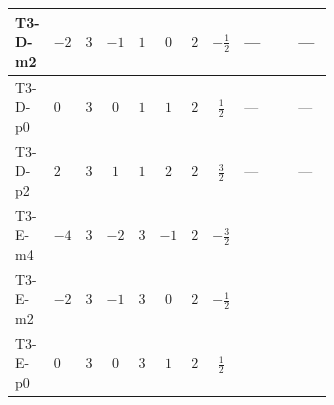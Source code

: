 \documentclass[8pt]{article}
\begin{document}
\begin{landscape}
\begin{longtable}{@{}llcccccc >{\raggedright\arraybackslash}p{0.21\linewidth} >{\raggedright\arraybackslash}p{0.21\linewidth} >{\raggedright\arraybackslash}p{0.21\linewidth}@{}}
\midrule
T3-D-m2 & $-2$ & $3$ & $-1$ & $1$ & $0$ & $2$ & $-\frac{1}{2}$ & --- & \scriptsize\adjustbox{max width=\linewidth}{$\begin{gathered} +10 {\lambda_{S_2}^{(1)}}^2\end{gathered}$} & --- \\
\midrule
T3-D-p0 & $0$ & $3$ & $0$ & $1$ & $1$ & $2$ & $\frac{1}{2}$ & --- & \scriptsize\adjustbox{max width=\linewidth}{$\begin{gathered} +10 {\lambda_{S_2}^{(1)}}^2\end{gathered}$} & --- \\
\midrule
T3-D-p2 & $2$ & $3$ & $1$ & $1$ & $2$ & $2$ & $\frac{3}{2}$ & --- & \scriptsize\adjustbox{max width=\linewidth}{$\begin{gathered} +10 {\lambda_{S_2}^{(1)}}^2\end{gathered}$} & --- \\
\midrule
T3-E-m4 & $-4$ & $3$ & $-2$ & $3$ & $-1$ & $2$ & $-\frac{3}{2}$ & \scriptsize\adjustbox{max width=\linewidth}{$\begin{gathered} +\frac{3 {\lambda_{HS_2}^{(A)}}^2}{2}\end{gathered}$} & \scriptsize\adjustbox{max width=\linewidth}{$\begin{gathered} +14 {\lambda_{S_2}^{(1)}}^2\end{gathered}$} & \scriptsize\adjustbox{max width=\linewidth}{$\begin{gathered} +26 {\lambda_{S_2}^{(A)}}^2\end{gathered}$} \\
\midrule
T3-E-m2 & $-2$ & $3$ & $-1$ & $3$ & $0$ & $2$ & $-\frac{1}{2}$ & \scriptsize\adjustbox{max width=\linewidth}{$\begin{gathered} +\frac{3 {\lambda_{HS_2}^{(A)}}^2}{2}\end{gathered}$} & \scriptsize\adjustbox{max width=\linewidth}{$\begin{gathered} +14 {\lambda_{S_2}^{(1)}}^2\end{gathered}$} & \scriptsize\adjustbox{max width=\linewidth}{$\begin{gathered} +26 {\lambda_{S_2}^{(A)}}^2\end{gathered}$} \\
\midrule
T3-E-p0 & $0$ & $3$ & $0$ & $3$ & $1$ & $2$ & $\frac{1}{2}$ & \scriptsize\adjustbox{max width=\linewidth}{$\begin{gathered} +\frac{3 {\lambda_{HS_2}^{(A)}}^2}{2}\end{gathered}$} & \scriptsize\adjustbox{max width=\linewidth}{$\begin{gathered} +14 {\lambda_{S_2}^{(1)}}^2\end{gathered}$} & \scriptsize\adjustbox{max width=\linewidth}{$\begin{gathered} +26 {\lambda_{S_2}^{(A)}}^2\end{gathered}$} \\

\end{longtable}
\end{landscape}
\end{document}
